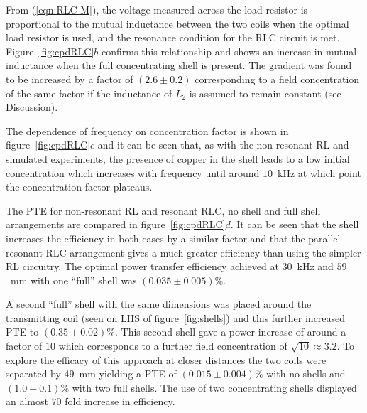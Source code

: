 \documentclass[11pt]{iopart}
\begin{document}
From (\ref{eqn:RLC-M}), the voltage measured across the load
resistor is proportional to the mutual inductance between the two
coils when the optimal load resistor is used, and the resonance
condition for the RLC circuit is met. Figure~\ref{fig:cpdRLC}$b$
confirms this relationship and shows an increase in mutual inductance
when the full concentrating shell is present. The gradient was found
to be increased by a factor of $(2.6 \pm 0.2)$ corresponding to a field
concentration of the same factor if the inductance of $L_2$ is assumed
to remain constant (see Discussion). 

The dependence of frequency on concentration factor is shown in
figure~\ref{fig:cpdRLC}$c$ and it can be seen that, as with the non-resonant RL and
simulated experiments, the presence of copper in the shell leads to a
low initial concentration which increases with frequency until around
$10$~kHz at which point the concentration factor plateaus.

The PTE for non-resonant RL and resonant RLC, no shell and full shell arrangements are
compared in figure~\ref{fig:cpdRLC}$d$. It can be seen that the shell
increases the efficiency in both cases by a similar factor and that
the parallel resonant RLC arrangement gives a much greater efficiency
than using the simpler RL circuitry. The optimal power transfer
efficiency achieved at $30$~kHz and $59$~mm with one ``full'' shell was
$(0.035\pm0.005)\%$. 

A second ``full'' shell with the same dimensions was placed around the
transmitting coil (seen on LHS of figure~\ref{fig:shells}) and this further
increased PTE to $(0.35\pm0.02)\%$. This second shell gave a power
increase of around a factor of $10$ which corresponds to a further
field concentration of $\sqrt{10} \approx 3.2$. To explore the
efficacy of this approach at closer distances the two coils were
separated by $49$~mm yielding a PTE of $(0.015\pm0.004)\%$ with no
shells and $(1.0\pm0.1)\%$ with two full shells. The use of two
concentrating shells displayed an almost $70$ fold increase in
efficiency.
\end{document}
